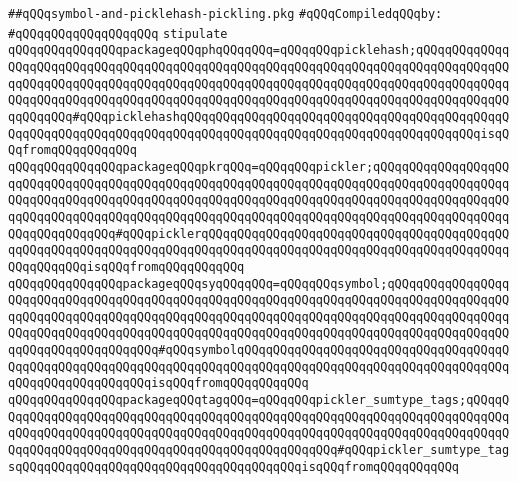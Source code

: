 \label{src/lib/compiler/front/semantic/pickle/symbol-and-picklehash-pickling.pkg}
\verb|##qQQqsymbol-and-picklehash-pickling.pkg|\newline
\newline
\verb|#qQQqCompiledqQQqby:|\newline
\verb|#qQQqqQQqqQQqqQQqqQQq|\newline
\newline
\newline
\newline
\verb|stipulate|\newline
\verb|qQQqqQQqqQQqqQQqpackageqQQqphqQQqqQQq=qQQqqQQqpicklehash;qQQqqQQqqQQqqQQqqQQqqQQqqQQqqQQqqQQqqQQqqQQqqQQqqQQqqQQqqQQqqQQqqQQqqQQqqQQqqQQqqQQqqQQqqQQqqQQqqQQqqQQqqQQqqQQqqQQqqQQqqQQqqQQqqQQqqQQqqQQqqQQqqQQqqQQqqQQqqQQqqQQqqQQqqQQqqQQqqQQqqQQqqQQqqQQqqQQqqQQqqQQqqQQqqQQqqQQqqQQqqQQqqQQqqQQq#qQQqpicklehashqQQqqQQqqQQqqQQqqQQqqQQqqQQqqQQqqQQqqQQqqQQqqQQqqQQqqQQqqQQqqQQqqQQqqQQqqQQqqQQqqQQqqQQqqQQqqQQqqQQqqQQqqQQqqQQqisqQQqfromqQQqqQQqqQQq|\newline
\verb|qQQqqQQqqQQqqQQqpackageqQQqpkrqQQq=qQQqqQQqpickler;qQQqqQQqqQQqqQQqqQQqqQQqqQQqqQQqqQQqqQQqqQQqqQQqqQQqqQQqqQQqqQQqqQQqqQQqqQQqqQQqqQQqqQQqqQQqqQQqqQQqqQQqqQQqqQQqqQQqqQQqqQQqqQQqqQQqqQQqqQQqqQQqqQQqqQQqqQQqqQQqqQQqqQQqqQQqqQQqqQQqqQQqqQQqqQQqqQQqqQQqqQQqqQQqqQQqqQQqqQQqqQQqqQQqqQQqqQQqqQQqqQQq#qQQqpicklerqQQqqQQqqQQqqQQqqQQqqQQqqQQqqQQqqQQqqQQqqQQqqQQqqQQqqQQqqQQqqQQqqQQqqQQqqQQqqQQqqQQqqQQqqQQqqQQqqQQqqQQqqQQqqQQqqQQqqQQqqQQqisqQQqfromqQQqqQQqqQQq|\newline
\verb|qQQqqQQqqQQqqQQqpackageqQQqsyqQQqqQQq=qQQqqQQqsymbol;qQQqqQQqqQQqqQQqqQQqqQQqqQQqqQQqqQQqqQQqqQQqqQQqqQQqqQQqqQQqqQQqqQQqqQQqqQQqqQQqqQQqqQQqqQQqqQQqqQQqqQQqqQQqqQQqqQQqqQQqqQQqqQQqqQQqqQQqqQQqqQQqqQQqqQQqqQQqqQQqqQQqqQQqqQQqqQQqqQQqqQQqqQQqqQQqqQQqqQQqqQQqqQQqqQQqqQQqqQQqqQQqqQQqqQQqqQQqqQQqqQQqqQQq#qQQqsymbolqQQqqQQqqQQqqQQqqQQqqQQqqQQqqQQqqQQqqQQqqQQqqQQqqQQqqQQqqQQqqQQqqQQqqQQqqQQqqQQqqQQqqQQqqQQqqQQqqQQqqQQqqQQqqQQqqQQqqQQqqQQqqQQqisqQQqfromqQQqqQQqqQQq|\newline
\verb|qQQqqQQqqQQqqQQqpackageqQQqtagqQQq=qQQqqQQqpickler_sumtype_tags;qQQqqQQqqQQqqQQqqQQqqQQqqQQqqQQqqQQqqQQqqQQqqQQqqQQqqQQqqQQqqQQqqQQqqQQqqQQqqQQqqQQqqQQqqQQqqQQqqQQqqQQqqQQqqQQqqQQqqQQqqQQqqQQqqQQqqQQqqQQqqQQqqQQqqQQqqQQqqQQqqQQqqQQqqQQqqQQqqQQqqQQqqQQqqQQq#qQQqpickler_sumtype_tagsqQQqqQQqqQQqqQQqqQQqqQQqqQQqqQQqqQQqqQQqisqQQqfromqQQqqQQqqQQq|\newline
